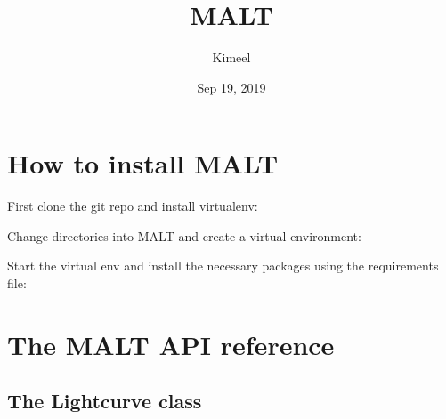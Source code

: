 \documentclass[a4paper,10pt,english]{sphinxmanual}
\title{MALT}
\date{Sep 19, 2019}
\author{Kimeel}
\begin{document}
\pagestyle{empty}
\sphinxmaketitle
\pagestyle{plain}
\sphinxtableofcontents
\pagestyle{normal}
\label{\detokenize{index::doc}}



\chapter{How to install MALT}
\label{\detokenize{install:how-to-install-malt}}\label{\detokenize{install::doc}}
First clone the git repo and install virtualenv:

\begin{sphinxVerbatim}[commandchars=\\\{\}]
  

     
\end{sphinxVerbatim}

Change directories into MALT and create a virtual environment:

\begin{sphinxVerbatim}[commandchars=\\\{\}]
 

   
\end{sphinxVerbatim}

Start the virtual env and install the necessary packages using the requirements file:

\begin{sphinxVerbatim}[commandchars=\\\{\}]
 

   
\end{sphinxVerbatim}


\chapter{The MALT API reference}
\label{\detokenize{api:the-malt-api-reference}}\label{\detokenize{api::doc}}

\section{The Lightcurve class}
\label{\detokenize{api:the-lightcurve-class}}
\end{document}
